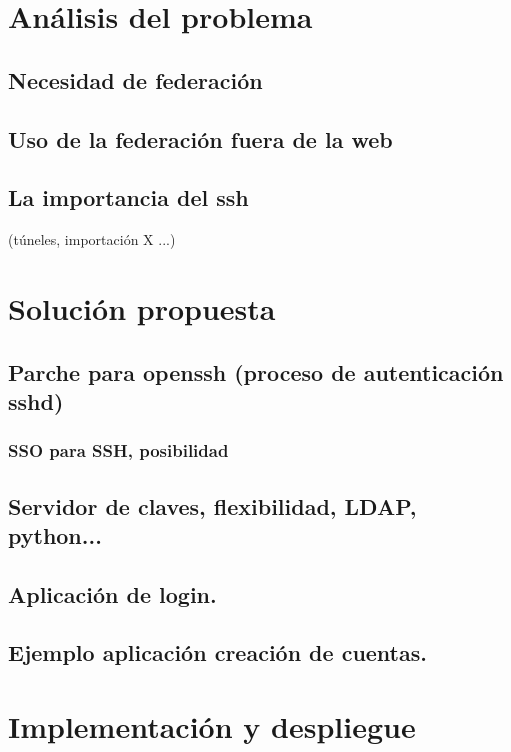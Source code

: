

\tableofcontents




\chapter{Análisis del problema}
    \section{Necesidad de federación}
    \section{Uso de la federación fuera de la web}
    \section{La importancia del ssh}
         (túneles, importación X ...)


\chapter{Solución propuesta}
    \section{Parche para openssh (proceso de autenticación sshd)}
    \label{openssh}
        \subsection{SSO para SSH, posibilidad}
    \section{Servidor de claves, flexibilidad, LDAP, python...}
    \section{Aplicación de login.}
    \section{Ejemplo aplicación creación de cuentas.}


\chapter{Implementación y despliegue}
    \label{implementacion}
